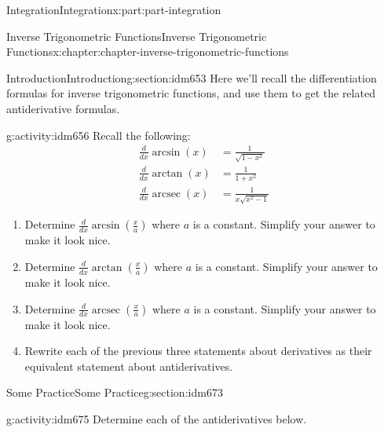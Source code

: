 \documentclass[oneside,10pt,]{book}
\numberwithin{equation}{section}
\DeclareMathOperator{\arcsec}{arcsec}
\newcommand{\amp}{&}
\begin{document}
\begin{partptx}{Integration}{}{Integration}{}{}{x:part:part-integration}
\typeout{************************************************}
%
\begin{chapterptx}{Inverse Trigonometric Functions}{}{Inverse Trigonometric Functions}{}{}{x:chapter:chapter-inverse-trigonometric-functions}
%
%
\typeout{************************************************}
\typeout{************************************************}
%
\begin{sectionptx}{Introduction}{}{Introduction}{}{}{g:section:idm653}
Here we'll recall the differentiation formulas for inverse trigonometric functions, and use them to get the related antiderivative formulas.%
\begin{activity}{}{g:activity:idm656}%
Recall the following:%
%
\begin{align*}
\displaystyle \frac{d}{dx}\arcsin(x) \amp = \frac{1}{\sqrt{1-x^2}}\\
\displaystyle \frac{d}{dx}\arctan(x) \amp = \frac{1}{1+x^2}\\
\displaystyle \frac{d}{dx}\arcsec(x) \amp = \frac{1}{x\sqrt{x^2-1}}
\end{align*}
\begin{enumerate}[font=\bfseries,label=(\alph*),ref=\alph*]
\item{}Determine \(\displaystyle \frac{d}{dx}\arcsin\left(\frac{x}{a}\right)\) where \(a\) is a constant. Simplify your answer to make it look nice.\item{}Determine \(\displaystyle \frac{d}{dx}\arctan\left(\frac{x}{a}\right)\) where \(a\) is a constant. Simplify your answer to make it look nice.\item{}Determine \(\displaystyle \frac{d}{dx}\arcsec\left(\frac{x}{a}\right)\) where \(a\) is a constant. Simplify your answer to make it look nice.\item{}Rewrite each of the previous three statements about derivatives as their equivalent statement about antiderivatives.\end{enumerate}
\end{activity}
\end{sectionptx}
%
%
\typeout{************************************************}
\typeout{************************************************}
%
\begin{sectionptx}{Some Practice}{}{Some Practice}{}{}{g:section:idm673}
\begin{activity}{}{g:activity:idm675}%
Determine each of the antiderivatives below.\begin{enumerate}[font=\bfseries,label=(\alph*),ref=\alph*]

\end{enumerate}
\end{activity}
\end{sectionptx}
\end{chapterptx}
\end{partptx}
\end{document}

